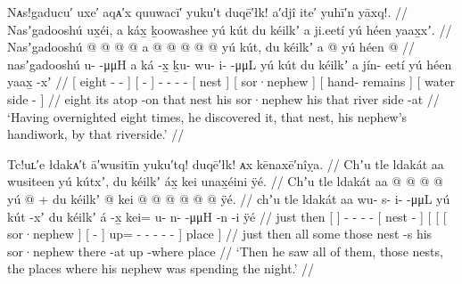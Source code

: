 \ex\label{ex:91-48-discovered-nest-handiwork-riverside}%
%
\begingl
	\glpreamble	Nᴀs!gaducu′ uxe′ aqᴀ′x quuwacī′ yuku′t duqē′łk! a′djî ite′ yuhī′n yāxq!. //
	\glpreamble	Nasʼgadooshú ux̱éi, a káx̱ ḵoowashee yú kút du kéilkʼ a ji.eetí yú héen yaax̱xʼ. //
	\gla	{} Nasʼgadooshú  @ {} @ {} @ {} @ {} {}
		{} a  @ {} {}
		 @ {} @ {} @ {} @ {}
		{} yú kút, {}
		{} du kéilkʼ {}
		{} a  @ {} {}
		{} yú héen  @ {} {} //
	\glb	{} nasʼgadooshú {} u-  -μμH {} {}
		{} a ká -x̱ {}
		ḵu- wu- i-  -μμL
		{} yú kút {}
		{} du kéilkʼ {}
		{} a jín- eetí {}
		{} yú héen yaax̱ -xʼ {} //
	\glc	{}[ eight \· -  - \· {}]
		{}[   - {}]
		- - -  -
		{}[  nest {}]
		{}[  sor·nephew {}]
		{}[  hand- remains {}]
		{}[  water side - {}] //
	\gld	{} eight  {} {} {} {} {}
		{} its atop -on {}
		 {} {} {} {}
		{} that nest {}
		{} his sor·nephew {}
		{} his  {} {}
		{} that river side -at {} //
	\glft	‘Having overnighted eight times, he discovered it, that nest, his nephew’s handiwork, by that riverside.’
		//
\endgl
\xe

\ex\label{ex:91-49-saw-all-those-nests}%
%
\begingl
	\glpreamble	Tc!uʟ′e łdakᴀ′t ā′wusitīn yuku′tq! duqē′łk! ᴀx kēnaxē′nîỵa. //
	\glpreamble	Chʼu tle ldakát aa wusiteen yú kútxʼ, du kéilkʼ áx̱ kei unax̱éini ÿé. //
	\gla	Chʼu tle {} ldakát aa {}
		 @ {} @ {} @ {} @ {}
		{} yú  @ {} {} +
		{} {} {} du kéilkʼ {}
			{}  @ {} {}
			kei @  @ {} @ {} @ {} @ {} @ {} {} ÿé. //
	\glb	chʼu tle {} ldakát aa {}
		wu- s- i-  -μμL
		{} yú kút -xʼ {} 
		{} {} {} du kéilkʼ {}
			{} á -x̱ {}
			kei= u- n-  -μμH -n -i {} ÿé {} //
	\glc	just then {}[   {}]
		- - -  -
		{}[  nest - {}]
		{}[ {}[ {}[  sor·nephew {}]
			{}[  - {}]
			up= - -  - - - {}] place {}] //
	\gld	just then {} all some {} 
		 {} {} {} {}
		{} those nest -s {}
		{} {} {} his sor·nephew {}
			{} there -at {}
			up  {} {} {} {} -where {} place {} //
	\glft	‘Then he saw all of them, those nests, the places where his nephew was spending the night.’
		//
\endgl
\xe

